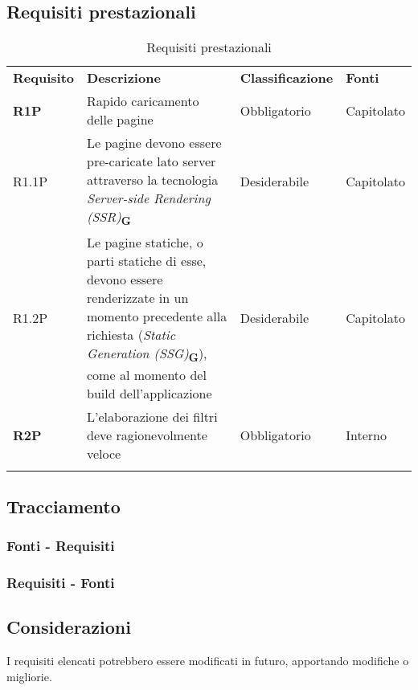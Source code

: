 \subsection{Requisiti prestazionali}
\begin{center}
    \centering
    \renewcommand{\arraystretch}{1.8}
    \label{tab:RequisitiPrestazionali}
    \begin{longtable}[!h]{p{50px} p{200px} p{100px} p{50px}}
        \rowcolor{logo!70} \textbf{Requisito} & \textbf{Descrizione}                                                                                                                                                                                                       & \textbf{Classificazione} & \textbf{Fonti} \\
        \textbf{R1P}                          & Rapido caricamento delle pagine                                                                                                                                                                                            & Obbligatorio             & Capitolato     \\
        R1.1P                                 & Le pagine devono essere pre-caricate lato server attraverso la tecnologia \textit{Server-side Rendering (SSR)}\textsubscript{\textbf{G}}                                                                                   & Desiderabile             & Capitolato     \\
        R1.2P                                 & Le pagine statiche, o parti statiche di esse, devono essere renderizzate in un momento precedente alla richiesta (\textit{Static Generation (SSG)}\textsubscript{\textbf{G}}), come al momento del build dell'applicazione & Desiderabile             & Capitolato     \\
        \textbf{R2P}                          & L'elaborazione dei filtri deve ragionevolmente veloce                                                                                                                                                                      & Obbligatorio             & Interno        \\
        \rowcolor{white}\caption{Requisiti prestazionali}
    \end{longtable}
\end{center}

\newpage
\subsection{Tracciamento}
\subsubsection{Fonti - Requisiti}


\newpage
\subsubsection{Requisiti - Fonti}


\subsection{Considerazioni}
I requisiti elencati potrebbero essere modificati in futuro, apportando modifiche o migliorie.
